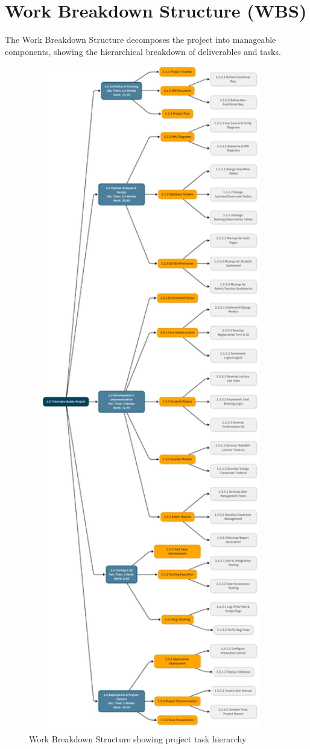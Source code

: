 \section{Work Breakdown Structure (WBS)}

The Work Breakdown Structure decomposes the project into manageable components, showing the hierarchical breakdown of deliverables and tasks.

\begin{figure}[h]
    \centering
    \includegraphics[width=0.95\textwidth]{images/WBS.jpg}
    \caption{Work Breakdown Structure showing project task hierarchy}
    \label{fig:wbs}
\end{figure}

